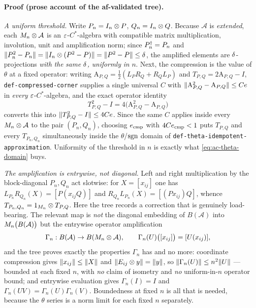 \paragraph{Proof (prose account of the af-validated tree).}
\emph{A uniform threshold.} Write $P_n=I_{n}\otimes P$, $Q_n=I_{n}\otimes Q$. Because
$\mathcal A$ is \emph{extended}, each $M_{n}\otimes \mathcal A$ is an $\varepsilon$-$C^*$-algebra
with compatible matrix multiplication, involution, unit and amplification norm; since
$P_n^{\dagger}=P_n$ and $\lVert P_n^2-P_n\rVert=\lVert I_{n}\otimes (P^2-P)\rVert=\lVert P^2-P\rVert\le\delta$, the
amplified elements are $\delta$-projections \emph{with the same $\delta$, uniformly in
$n$}. Next, the compression is the value of $\theta$ at a fixed operator: writing
$\mathrm A_{P,Q}=\tfrac12(L_PR_Q+R_QL_P)$ and $T_{P,Q}=2\mathrm A_{P,Q}-I$,
\texttt{def-compressed-corner} supplies a single universal $C$ with
$\lVert \mathrm A_{P,Q}^2-\mathrm A_{P,Q}\rVert\le Ce$ in \emph{every} $\varepsilon$-$C^*$-algebra,
and the exact operator identity
\begin{equation}\label{eq:ac-theta-domain}
  T_{P,Q}^2-I=4\bigl(\mathrm A_{P,Q}^2-\mathrm A_{P,Q}\bigr)
\end{equation}
converts this into $\lVert T_{P,Q}^2-I\rVert\le4Ce$. Since the same $C$ applies inside every
$M_{n}\otimes \mathcal A$ to the pair $(P_n,Q_n)$, choosing $e_{\mathrm{cmp}}$ with
$4Ce_{\mathrm{cmp}}<1$ puts $T_{P,Q}$ and every $T_{P_n,Q_n}$ simultaneously inside the
$\theta$/$\operatorname{sgn}$ domain of \texttt{def-theta-idempotent-approximation}. Uniformity of the
threshold in $n$ is exactly what \eqref{eq:ac-theta-domain} buys.

\emph{The amplification is entrywise, not diagonal.} Left and right multiplication by the
block-diagonal $P_n,Q_n$ act slotwise: for $X=[x_{ij}]$ one has
$L_{P_n}R_{Q_n}(X)=[P(x_{ij}Q)]$ and $R_{Q_n}L_{P_n}(X)=[(Px_{ij})Q]$, whence
$T_{P_n,Q_n}=1_{M_{n}}\otimes T_{P,Q}$. Here the tree records a correction that is genuinely
load-bearing. The relevant map is \emph{not} the diagonal embedding of $B(\mathcal A)$
into $M_{n}\bigl(B(\mathcal A)\bigr)$ but the entrywise operator amplification
\[
  \Gamma_n:B(\mathcal A)\to B(M_{n}\otimes \mathcal A),\qquad
  \Gamma_n(U)\bigl([x_{ij}]\bigr)=[U(x_{ij})],
\]
and the tree proves exactly the properties $\Gamma_n$ has and no more: coordinate
compression gives $\lVert x_{ij}\rVert\le\lVert X\rVert$ and $\lVert E_{ij}\otimes y\rVert=\lVert y\rVert$, so
$\lVert \Gamma_n(U)\rVert\le n^2\lVert U\rVert$ --- bounded at each fixed $n$, with \emph{no} claim of
isometry and \emph{no} uniform-in-$n$ operator bound; and entrywise evaluation gives
$\Gamma_n(I)=I$ and $\Gamma_n(UV)=\Gamma_n(U)\Gamma_n(V)$. Boundedness at fixed $n$ is all
that is needed, because the $\theta$ series is a norm limit for each fixed $n$
separately.

